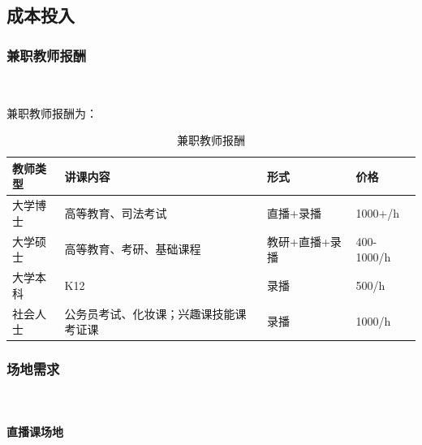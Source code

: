 \subsection{成本投入}
\subsubsection{兼职教师报酬}\

兼职教师报酬为：
\begin{table}[H]
  \centering
  \caption{兼职教师报酬}
    \begin{tabular}{|p{5.165em}|p{8.665em}|p{6.835em}|p{5.5em}|}
    \hline
    \textcolor[rgb]{ .298,  .282,  .239}{教师类型} & \textcolor[rgb]{ .298,  .282,  .239}{讲课内容} & \textcolor[rgb]{ .298,  .282,  .239}{形式} & \textcolor[rgb]{ .298,  .282,  .239}{价格} \\
    \hline
    \textcolor[rgb]{ .298,  .282,  .239}{大学博士} & \textcolor[rgb]{ .298,  .282,  .239}{高等教育、司法考试} & \textcolor[rgb]{ .298,  .282,  .239}{直播+录播} & \textcolor[rgb]{ .298,  .282,  .239}{1000+/h} \\
    \hline
    \textcolor[rgb]{ .298,  .282,  .239}{大学硕士} & \textcolor[rgb]{ .298,  .282,  .239}{高等教育、考研、基础课程} & \textcolor[rgb]{ .298,  .282,  .239}{教研+直播+录播} & \textcolor[rgb]{ .298,  .282,  .239}{400-1000/h} \\
    \hline
    \textcolor[rgb]{ .298,  .282,  .239}{大学本科} & \textcolor[rgb]{ .298,  .282,  .239}{K12} & \textcolor[rgb]{ .298,  .282,  .239}{录播} & \textcolor[rgb]{ .298,  .282,  .239}{500/h} \\
    \hline
    \textcolor[rgb]{ .298,  .282,  .239}{社会人士} & \textcolor[rgb]{ .298,  .282,  .239}{公务员考试、化妆课；兴趣课技能课考证课} & \textcolor[rgb]{ .298,  .282,  .239}{录播} & \textcolor[rgb]{ .298,  .282,  .239}{1000/h} \\
    \hline
    \end{tabular}%
  \label{tab:jzlsbc}%
\end{table}%


\subsubsection{场地需求}\

\paragraph{直播课场地}\

